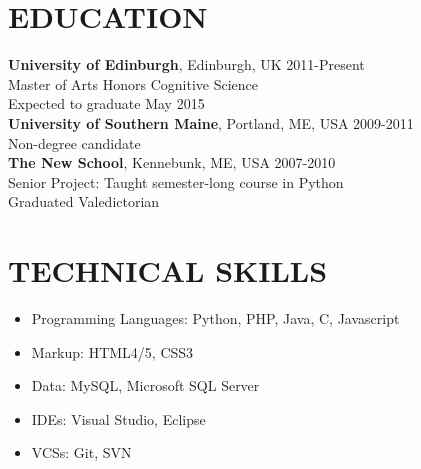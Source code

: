 \documentclass[line, margin]{res}
\newcommand{\CS}{C\nolinebreak\hspace{-.05em}\raisebox{.6ex}{\scriptsize\bf \#}}
\begin{document}
\address{24 Lutton Place, Edinburgh, Scotland EH8 9PE | 001 44 7719 663016 | chase@chasestevens.com}

\begin{resume}
\section{EDUCATION}
\textbf{University of Edinburgh}, Edinburgh, UK \hfill 2011-Present\\
Master of Arts Honors Cognitive Science \\
Expected to graduate May 2015 \\[5pt]
\textbf{University of Southern Maine}, Portland, ME, USA \hfill 2009-2011\\
Non-degree candidate\\[5pt]
\textbf{The New School}, Kennebunk, ME, USA \hfill 2007-2010\\
Senior Project: Taught semester-long course in Python \\
Graduated Valedictorian

\section{TECHNICAL SKILLS}
\begin{itemize}[leftmargin=10pt]
\item Programming Languages: Python, PHP, Java, \CS, Javascript
\item Markup: HTML4/5, CSS3
\item Data: MySQL, Microsoft SQL Server
\item IDEs: Visual Studio, Eclipse
\item VCSs: Git, SVN
\end{itemize}


\end{resume}
\end{document}

